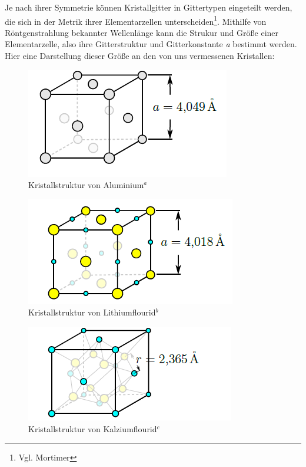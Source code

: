 \documentclass[12pt,a4paper,titlepage,headinclude,bibtotoc]{scrartcl}
\begin{document}
Je nach ihrer Symmetrie können Kristallgitter in Gittertypen eingeteilt werden, die sich in der Metrik ihrer Elementarzellen unterscheiden\footnote{Vgl. Mortimer}. Mithilfe von Röntgenstrahlung bekannter Wellenlänge kann die Strukur und Größe einer Elementarzelle, also ihre Gitterstruktur und Gitterkonstante \textit{a} bestimmt werden. Hier eine Darstellung dieser Größe an den von uns vermessenen Kristallen:




\begin{figure} [h]
\begin{center}
\includegraphics[scale=0.7]{Aluminium.png} \end{center}
\caption{Kristallstruktur von Aluminium$^a$}
\end{figure}

\begin{figure} [h]
\begin{center}
\includegraphics[scale=0.7]{Lithiumflourid.png} \end{center}
\caption{Kristallstruktur von Lithiumflourid$^b$}
\end{figure}

\begin{figure} [h]
\begin{center}
\includegraphics[scale=0.7]{Calciumflourid.png} \end{center}
\caption{Kristallstruktur von Kalziumflourid$^c$}
\end{figure}
\end{document}
